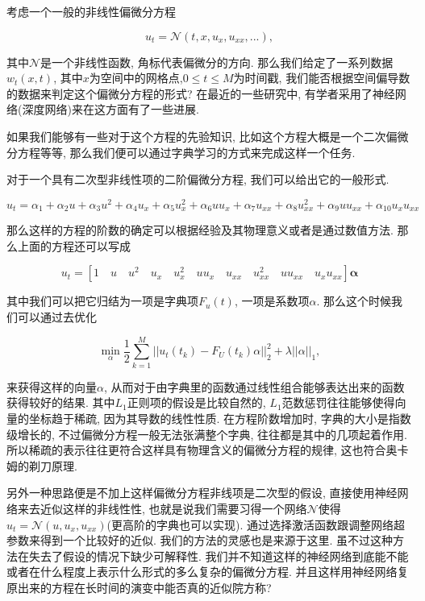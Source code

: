 \documentclass[lang=cn,11pt]{elegantpaper}
\begin{document}
考虑一个一般的非线性偏微分方程

\begin{equation}
	u_t=\mathcal N(t,x,u_x,u_{xx},...),
\end{equation}

其中$\mathcal N$是一个非线性函数, 角标代表偏微分的方向. 那么我们给定了一系列数据$w_t(x,t)$, 其中$x$为空间中的网格点,$0\leq t\leq M$为时间戳, 我们能否根据空间偏导数的数据来判定这个偏微分方程的形式? 在最近的一些研究中, 有学者采用了神经网络(深度网络)来在这方面有了一些进展.

如果我们能够有一些对于这个方程的先验知识, 比如这个方程大概是一个二次偏微分方程等等, 那么我们便可以通过字典学习的方式来完成这样一个任务.

对于一个具有二次型非线性项的二阶偏微分方程, 我们可以给出它的一般形式.

\begin{equation}
	u_t=\alpha_1+\alpha_2u+\alpha_3u^2+\alpha_4u_x+\alpha_5u_x^2+\alpha_6uu_x+\alpha_7u_{xx}+\alpha_8u_{xx}^2+\alpha_9uu_{xx}+\alpha_{10}u_xu_{xx}
\end{equation}

那么这样的方程的阶数的确定可以根据经验及其物理意义或者是通过数值方法. 那么上面的方程还可以写成

\begin{equation}
	u_t=[1\quad u\quad u^2\quad u_x\quad u_x^2\quad uu_x\quad u_{xx}\quad u_{xx}^2\quad uu_{xx}\quad u_xu_{xx}] \mathbf \alpha
\end{equation}

其中我们可以把它归结为一项是字典项$F_u(t)$, 一项是系数项$\alpha$. 那么这个时候我们可以通过去优化

\begin{equation}
	\min_\alpha \dfrac{1}{2}\sum_{k=1}^M ||u_t(t_k)-F_U(t_k)\alpha||_2^2+\lambda||\alpha||_1,
\end{equation}

来获得这样的向量$\alpha$, 从而对于由字典里的函数通过线性组合能够表达出来的函数获得较好的结果. 其中$L_1$正则项的假设是比较自然的, $L_1$范数惩罚往往能够使得向量的坐标趋于稀疏, 因为其导数的线性性质. 在方程阶数增加时, 字典的大小是指数级增长的, 不过偏微分方程一般无法张满整个字典, 往往都是其中的几项起着作用. 所以稀疏的表示往往更符合这样具有物理含义的偏微分方程的规律, 这也符合奥卡姆的剃刀原理.

另外一种思路便是不加上这样偏微分方程非线项是二次型的假设, 直接使用神经网络来去近似这样的非线性性, 也就是说我们需要习得一个网络$\mathcal N$使得$u_t=\mathcal N(u,u_x,u_{xx})$(更高阶的字典也可以实现). 通过选择激活函数跟调整网络超参数来得到一个比较好的近似. 我们的方法的灵感也是来源于这里. 虽不过这种方法在失去了假设的情况下缺少可解释性. 我们并不知道这样的神经网络到底能不能或者在什么程度上表示什么形式的多么复杂的偏微分方程. 并且这样用神经网络复原出来的方程在长时间的演变中能否真的近似院方称?


\nocite{*}



\end{document}

